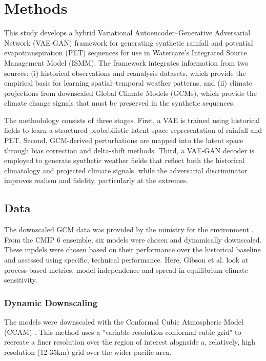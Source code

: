 \chapter{Methods}

This study develops a hybrid Variational Autoencoder–Generative Adversarial Network (VAE-GAN) framework for generating synthetic rainfall and potential evapotranspiration (PET) sequences for use in Watercare’s Integrated Source Management Model (ISMM). The framework integrates information from two sources: (i) historical observations and reanalysis datasets, which provide the empirical basis for learning spatial–temporal weather patterns, and (ii) climate projections from downscaled Global Climate Models (GCMs), which provide the climate change signals that must be preserved in the synthetic sequences.

The methodology consists of three stages. First, a VAE is trained using historical fields to learn a structured probabilistic latent space representation of rainfall and PET. Second, GCM-derived perturbations are mapped into the latent space through bias correction and delta-shift methods. Third, a VAE-GAN decoder is employed to generate synthetic weather fields that reflect both the historical climatology and projected climate signals, while the adversarial discriminator improves realism and fidelity, particularly at the extremes.

\section{Data}


The downscaled GCM data was provided by the ministry for the environment \cite{GCM} 
\cite{user-guidance}. From the CMIP 6 ensemble, six models were chosen and dynamically
downscaled. These mpdels were chosen based on their performance over the historical 
baseline and assessed using specific, technical performance. Here, Gibson et al.
\cite{GCM} look at process-based metrics, model independence and spread in equilibrium
climate sensitivity.

\subsection{Dynamic Downscaling} \label{Section:DynamicDownscaling}

The models were downscaled with the Conformal Cubic Atmospheric Model (CCAM) \cite{CCAM}.
This method uses a "variable-resolution conformal-cubic grid" to recreate a finer resolution 
over the region of interest alognside a, relatively, high resolution (12-35km) grid over the
wider pacific area.

